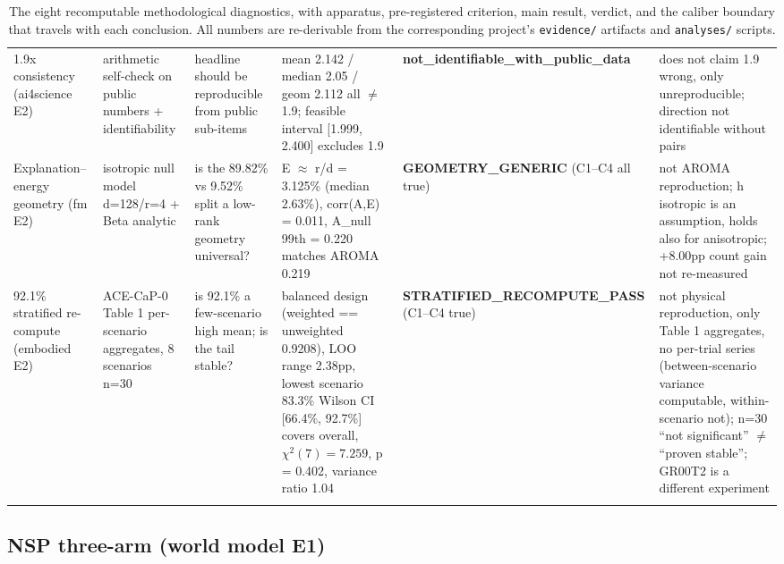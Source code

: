 \begin{center}
\begin{longtable}{@{}p{2.3cm}p{2.5cm}p{2.5cm}p{3.6cm}p{1.85cm}p{2.6cm}@{}}
1.9x consistency (ai4science E2) & arithmetic self-check on public numbers + identifiability & headline should be reproducible from public sub-items & mean 2.142 / median 2.05 / geom 2.112 all $\neq$ 1.9; feasible interval [1.999, 2.400] excludes 1.9 & \textbf{not\_identifiable\_with\_public\_data} & does not claim 1.9 wrong, only unreproducible; direction not identifiable without pairs \\
Explanation--energy geometry (fm E2) & isotropic null model d=128/r=4 + Beta analytic & is the 89.82\% vs 9.52\% split a low-rank geometry universal? & E $\approx$ r/d = 3.125\% (median 2.63\%), corr(A,E) = 0.011, A\_null 99th = 0.220 matches AROMA 0.219 & \textbf{GEOMETRY\_GENERIC} (C1--C4 all true) & not AROMA reproduction; h isotropic is an assumption, holds also for anisotropic; +8.00pp count gain not re-measured \\
92.1\% stratified re-compute (embodied E2) & ACE-CaP-0 Table 1 per-scenario aggregates, 8 scenarios n=30 & is 92.1\% a few-scenario high mean; is the tail stable? & balanced design (weighted == unweighted 0.9208), LOO range 2.38pp, lowest scenario 83.3\% Wilson CI [66.4\%, 92.7\%] covers overall, $\chi^2(7) = 7.259$, p = 0.402, variance ratio 1.04 & \textbf{STRATIFIED\_RECOMPUTE\_PASS} (C1--C4 true) & not physical reproduction, only Table 1 aggregates, no per-trial series (between-scenario variance computable, within-scenario not); n=30 ``not significant'' $\neq$ ``proven stable''; GR00T2 is a different experiment \\
\bottomrule
\caption{The eight recomputable methodological diagnostics, with apparatus,
pre-registered criterion, main result, verdict, and the caliber boundary that
travels with each conclusion. All numbers are re-derivable from the corresponding
project's \texttt{evidence/} artifacts and \texttt{analyses/} scripts.}
\label{tab:eight}
\end{longtable}
\end{center}

\subsection{NSP three-arm (world model E1)}

